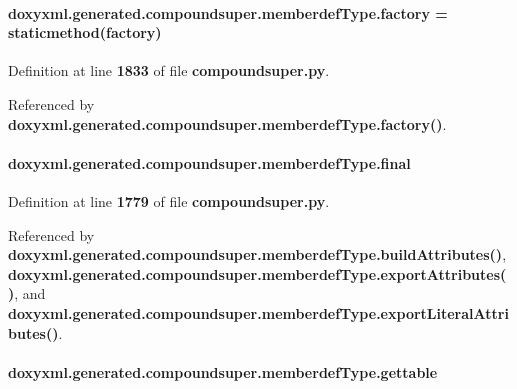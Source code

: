 \paragraph[{factory}]{\setlength{\rightskip}{0pt plus 5cm}doxyxml.\+generated.\+compoundsuper.\+memberdef\+Type.\+factory = staticmethod(factory)\hspace{0.3cm}{\ttfamily [static]}}\label{classdoxyxml_1_1generated_1_1compoundsuper_1_1memberdefType_a7ff584bce84cd43bc6ce0c6e745801c2}


Definition at line {\bf 1833} of file {\bf compoundsuper.\+py}.



Referenced by {\bf doxyxml.\+generated.\+compoundsuper.\+memberdef\+Type.\+factory()}.

\paragraph[{final}]{\setlength{\rightskip}{0pt plus 5cm}doxyxml.\+generated.\+compoundsuper.\+memberdef\+Type.\+final}\label{classdoxyxml_1_1generated_1_1compoundsuper_1_1memberdefType_a5d6e9c0dcd8e13771ae2b03870442520}


Definition at line {\bf 1779} of file {\bf compoundsuper.\+py}.



Referenced by {\bf doxyxml.\+generated.\+compoundsuper.\+memberdef\+Type.\+build\+Attributes()}, {\bf doxyxml.\+generated.\+compoundsuper.\+memberdef\+Type.\+export\+Attributes()}, and {\bf doxyxml.\+generated.\+compoundsuper.\+memberdef\+Type.\+export\+Literal\+Attributes()}.

\paragraph[{gettable}]{\setlength{\rightskip}{0pt plus 5cm}doxyxml.\+generated.\+compoundsuper.\+memberdef\+Type.\+gettable}\label{classdoxyxml_1_1generated_1_1compoundsuper_1_1memberdefType_a54e5c0e592d0c79f890f0acbae75cd0c}


